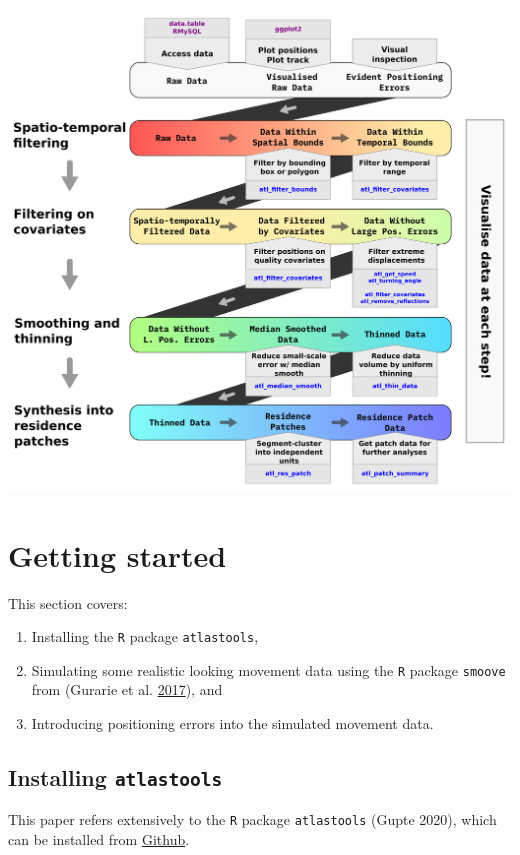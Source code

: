 \documentclass[
]{scrreprt}
\begin{document}
\includegraphics{figures/fig_recipe.png}

\hypertarget{getting-started}{%
\chapter{Getting started}\label{getting-started}}

This section covers:

\begin{enumerate}
\def\labelenumi{\arabic{enumi}.}
\item
  Installing the \texttt{R} package \texttt{atlastools},
\item
  Simulating some realistic looking movement data using the \texttt{R} package \texttt{smoove} from (Gurarie et al. \protect\hyperlink{ref-gurarie2017}{2017}), and
\item
  Introducing positioning errors into the simulated movement data.
\end{enumerate}

\hypertarget{installing-atlastools}{%
\section{\texorpdfstring{Installing \texttt{atlastools}}{Installing atlastools}}\label{installing-atlastools}}

This paper refers extensively to the \texttt{R} package \texttt{atlastools} (Gupte 2020), which can be installed from \href{https://github.com/pratikunterwegs/atlastools}{Github}.
\end{document}
